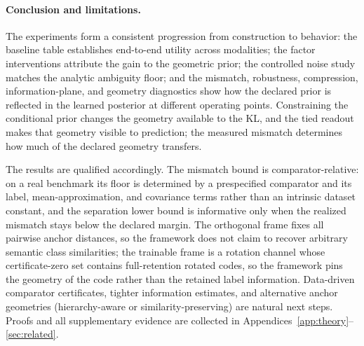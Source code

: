 \paragraph{Conclusion and limitations.} The experiments form a consistent
progression from construction to behavior: the baseline table establishes end-to-end
utility across modalities; the factor interventions attribute the gain to the
geometric prior; the controlled noise study matches the analytic ambiguity floor; and
the mismatch, robustness, compression, information-plane, and geometry diagnostics
show how the declared prior is reflected in the learned posterior at different
operating points. Constraining the conditional prior changes the geometry available
to the KL, and the tied readout makes that geometry visible to prediction; the
measured mismatch determines how much of the declared geometry transfers.

The results are qualified accordingly. The mismatch bound is comparator-relative: on
a real benchmark its floor is determined by a prespecified comparator and its label,
mean-approximation, and covariance terms rather than an intrinsic dataset constant,
and the separation lower bound is informative only when the realized mismatch stays
below the declared margin. The orthogonal frame fixes all pairwise anchor
distances, so the framework does not claim to recover arbitrary semantic class
similarities; the trainable frame is a rotation channel whose certificate-zero set
contains full-retention rotated codes, so the framework pins the geometry of the
code rather than the retained label information. Data-driven comparator certificates,
tighter information estimates, and alternative anchor geometries
(hierarchy-aware or similarity-preserving) are natural
next steps. Proofs and all
supplementary evidence are collected in Appendices~\ref{app:theory}--\ref{sec:related}.
